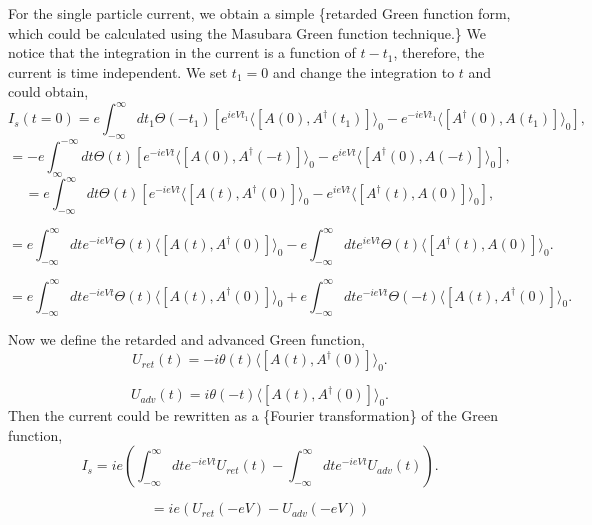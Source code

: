 \documentclass[11pt]{article}
\begin{document}
For the single particle current, we obtain a simple \{\pb retarded Green
function form, which could be calculated using the Masubara Green
function technique.\} We notice that the integration in the current is a
function of \(t-t_1\), therefore, the current is time independent. We
set \(t_1 = 0\) and change the integration to \(t\) and could obtain, \[
I_s(t=0) =e \int_{-\infty}^{\infty} dt_1 \Theta(-t_1)
\left[e^{ieVt_1} \langle  [A(0),A^{\dagger}(t_1)] \rangle_0 -e^{-ieV t_1} \langle  [A^{\dagger}(0),A(t_1)] \rangle_0 
\right],
\] \[
= - e \int_{\infty}^{-\infty} dt \Theta(t)
\left[e^{-ieVt} \langle  [A(0),A^{\dagger}(-t)] \rangle_0 -e^{ieV t} \langle  [A^{\dagger}(0),A(-t)] \rangle_0  
\right],
\] \[
= e \int_{-\infty}^{\infty} dt \Theta(t)
\left[e^{-ieVt} \langle  [A(t),A^{\dagger}(0)] \rangle_0 -e^{ieV t} \langle  [A^{\dagger}(t),A(0)] \rangle_0  
\right],
\]

\[
=e 
\int_{-\infty}^{\infty} dt e^{-ieVt}   \Theta(t) \langle  [A(t),A^{\dagger}(0)] \rangle_0 -e \int_{-\infty}^{\infty} dt e^{ieV t}   \Theta(t) \langle  [A^{\dagger}(t),A(0)] \rangle_0.
\]

\[
=  e 
\int_{-\infty}^{\infty} dt e^{-ieVt}   \Theta(t) \langle  [A(t),A^{\dagger}(0)] \rangle_0 +e \int_{-\infty}^{\infty} dt e^{-ieV t}   \Theta(-t) \langle  [A(t),A^\dagger(0)] \rangle_0.
\]

Now we define the retarded and advanced Green function, \[
U_{ret}(t)=-i \theta(t)  \langle  [A(t),A^\dagger(0)] \rangle_0. 
\]

\[
U_{adv}(t)= i \theta(-t)  \langle  [A(t),A^\dagger(0)] \rangle_0. 
\] Then the current could be rewritten as a \{\pb Fourier
transformation\} of the Green function,\\
\[
I_s =i e 
\left( \int_{-\infty}^{\infty} dt e^{-ieVt}  U_{ret}(t) -  \int_{-\infty}^{\infty} dt e^{-ieV t}    U_{adv}(t) \right).
\]

\[
= ie \left( U_{ret} (-eV) - U_{adv} (-eV) \right)
\]
\end{document}
